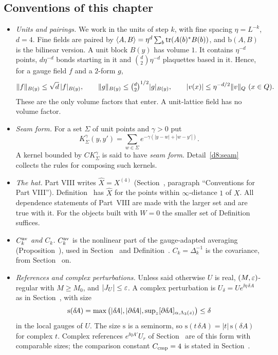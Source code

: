 \subsection{Conventions of this chapter}\label{d8:conv}

\begin{itemize}
\item \emph{Units and pairings.} We work in the units of step $k$, with fine spacing $\eta=L^{-k}$, $d=4$. Fine fields are paired by $\langle A,B\rangle=\eta^d\sum_b\operatorname{tr}(A(b)^*B(b))$, and $\mathrm b(A,B)$ is the bilinear version. A unit block $B(y)$ has volume $1$. It contains $\eta^{-d}$ points, $d\eta^{-d}$ bonds starting in it and $\binom d2\eta^{-d}$ plaquettes based in it. Hence, for a gauge field $f$ and a $2$-form $g$,
\begin{equation}\label{d8:eq:blocknorm}
\|f\|_{B(y)}\le\sqrt d\,|f|_{B(y)},\qquad\|g\|_{B(y)}\le\tbinom d2^{1/2}|g|_{B(y)},\qquad|v(x)|\le\eta^{-d/2}\|v\|_{Q}\ (x\in Q).
\end{equation}
These are the only volume factors that enter. A unit-lattice field has no volume factor.
\item \emph{Seam form.} For a set $\Sigma$ of unit points and $\gamma>0$ put
\[
K^\gamma_\Sigma(y,y')=\sum_{w\in\Sigma}e^{-\gamma(|y-w|+|w-y'|)} .
\]
A kernel bounded by $CK^\gamma_\Sigma$ is said to have \emph{seam form}. Detail~\ref{d8:seam} collects the rules for composing such kernels.
\item \emph{The hat.} Part VIII writes $\hat X=X^{(4)}$ (Section~, paragraph ``Conventions for Part VIII''). Definition~ has $\hat X$ for the points within $\infty$-distance $1$ of $X$. All dependence statements of Part~VIII are made with the larger set and are true with it. For the objects built with $W=0$ the smaller set of Definition~ suffices.
\item \emph{$C^{\rm av}_k$ and $C_k$.} $C^{\rm av}_k$ is the nonlinear part of the gauge-adapted averaging (Proposition~), used in Section~ and Definition~. $C_k=\Delta_k^{-1}$ is the covariance, from Section~ on.
\item \emph{References and complex perturbations.} Unless said otherwise $U$ is real, $(M,\varepsilon)$-regular with $M\ge M_0$, and $|J_U|\le\varepsilon$. A complex perturbation is $U_\delta=Ue^{\ii\eta\,\delta\!A}$ as in Section~, with size
\[
\mathrm s(\delta\!A)=\max\big(|\delta\!A|,|\partial\delta\!A|,\sup\nolimits_z[\partial\delta\!A]_{\alpha,\Lambda_3(z)}\big)\le\delta
\]
in the local gauges of $U$. The size $\mathrm s$ is a seminorm, so $\mathrm s(t\,\delta\!A)=|t|\,\mathrm s(\delta\!A)$ for complex $t$. Complex references $e^{\ii\eta A'}U_r$ of Section~ are of this form with comparable sizes; the comparison constant $C_{\rm cmp}=4$ is stated in Section~.
\end{itemize}

